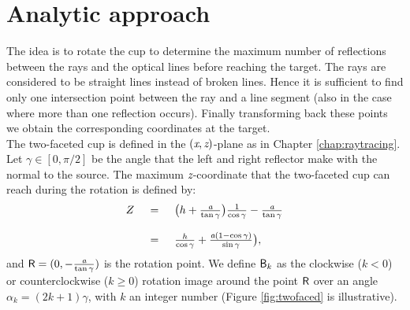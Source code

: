 \section{Analytic approach}
The idea is to rotate the cup to determine the maximum number of reflections between the rays and the optical lines before reaching the target. The rays are considered to be straight lines instead of broken lines. Hence it is sufficient to find only one intersection point between the ray and a line segment (also in the case where more than one reflection occurs). Finally transforming back these points we obtain the corresponding coordinates at the target.\\ \indent
The two-faceted cup is defined in the $(\textit{x}, \textit{z})$-plane as in Chapter \ref{chap:raytracing}. 
Let $\gamma\in[0, \pi/2]$ be the angle that the left and right reflector make with the normal to the source. 
The maximum $\textit{z}$-coordinate that the two-faceted cup can reach during the rotation is defined by:
\begin{equation}\label{rotation}\begin{tabular}{llll}
$Z$ & $=$ & $ \big(h+\frac{\variabile{a}}{\tan\gamma}\big)\frac{1}{\cos\gamma}-\frac{\variabile{a}}{\tan\gamma}$ \\ $ \quad$ & $ \quad $ & $ \quad $ \\$ \quad$ &  $=$ & $\frac{h}{\cos\gamma}+\frac{\variabile{a}(1-\cos\gamma)}{\sin\gamma}\big),$\end{tabular}
\end{equation} and $\textsf{R}=(0,-\frac{\textit{a}}{\tan\gamma})$ is the rotation point. We define $\textsf{B}_k$ as the clockwise ($k<0$) or counterclockwise ($k\geq 0$) rotation image around the point $\textsf{R}$ over an angle $\alpha_k=(2k+1)\gamma$, with $k$ an integer number (Figure \ref{fig:twofaced} is illustrative).
